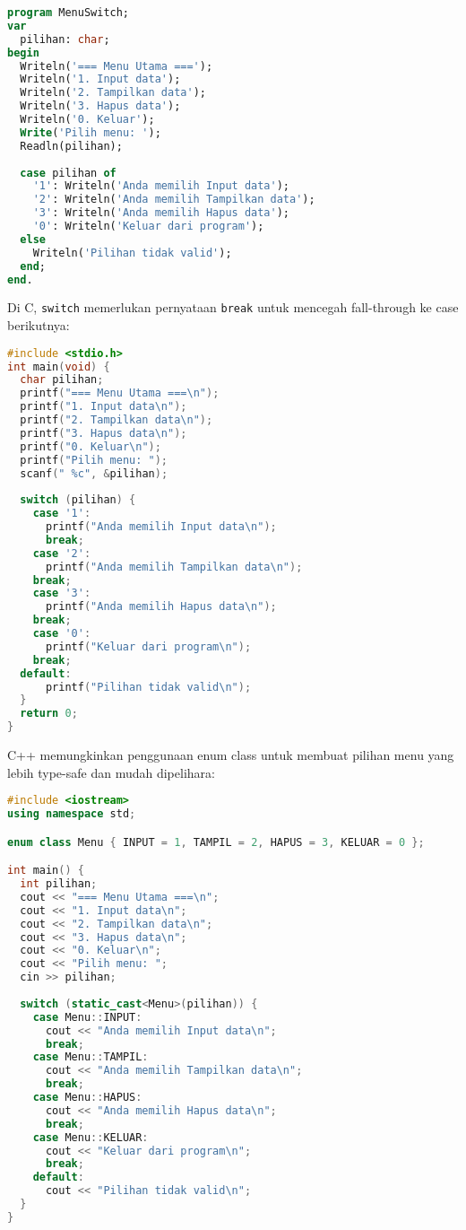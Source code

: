 \documentclass[../main.tex]{subfiles}
\begin{document}
\begin{lstlisting}[language=Pascal, caption={Menu dengan case di Pascal}]
program MenuSwitch;
var
  pilihan: char;
begin
  Writeln('=== Menu Utama ===');
  Writeln('1. Input data');
  Writeln('2. Tampilkan data');
  Writeln('3. Hapus data');
  Writeln('0. Keluar');
  Write('Pilih menu: ');
  Readln(pilihan);
  
  case pilihan of
    '1': Writeln('Anda memilih Input data');
    '2': Writeln('Anda memilih Tampilkan data');
    '3': Writeln('Anda memilih Hapus data');
    '0': Writeln('Keluar dari program');
  else
    Writeln('Pilihan tidak valid');
  end;
end.
\end{lstlisting}

Di C, \texttt{switch} memerlukan pernyataan \texttt{break} untuk mencegah fall-through ke case berikutnya:

\begin{lstlisting}[language=C, caption={Menu dengan switch di C}]
#include <stdio.h>
int main(void) {
  char pilihan;
  printf("=== Menu Utama ===\n");
  printf("1. Input data\n");
  printf("2. Tampilkan data\n");
  printf("3. Hapus data\n");
  printf("0. Keluar\n");
  printf("Pilih menu: ");
  scanf(" %c", &pilihan);
  
  switch (pilihan) {
    case '1':
      printf("Anda memilih Input data\n");
      break;
    case '2':
      printf("Anda memilih Tampilkan data\n");
    break;
    case '3':
      printf("Anda memilih Hapus data\n");
    break;
    case '0':
      printf("Keluar dari program\n");
    break;
  default:
      printf("Pilihan tidak valid\n");
  }
  return 0;
}
\end{lstlisting}

C++ memungkinkan penggunaan enum class untuk membuat pilihan menu yang lebih type-safe dan mudah dipelihara:

\begin{lstlisting}[language=C++, caption={Menu dengan switch dan enum di C++}]
#include <iostream>
using namespace std;

enum class Menu { INPUT = 1, TAMPIL = 2, HAPUS = 3, KELUAR = 0 };

int main() {
  int pilihan;
  cout << "=== Menu Utama ===\n";
  cout << "1. Input data\n";
  cout << "2. Tampilkan data\n";
  cout << "3. Hapus data\n";
  cout << "0. Keluar\n";
  cout << "Pilih menu: ";
  cin >> pilihan;
  
  switch (static_cast<Menu>(pilihan)) {
    case Menu::INPUT:
      cout << "Anda memilih Input data\n";
      break;
    case Menu::TAMPIL:
      cout << "Anda memilih Tampilkan data\n";
      break;
    case Menu::HAPUS:
      cout << "Anda memilih Hapus data\n";
      break;
    case Menu::KELUAR:
      cout << "Keluar dari program\n";
      break;
    default:
      cout << "Pilihan tidak valid\n";
  }
}
\end{lstlisting}
\end{document}
